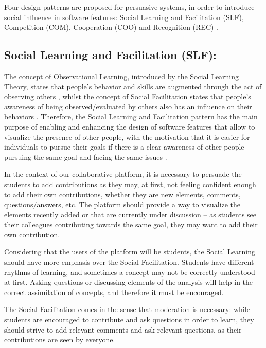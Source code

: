 Four design patterns are proposed for persuasive systems, in order to introduce social influence in software features: Social Learning and Facilitation (SLF), Competition (COM), Cooperation (COO) and Recognition (REC) \cite{oduor2014persuasive}. 

\subsection{Social Learning and Facilitation (SLF):}

The concept of Observational Learning, introduced by the Social Learning Theory, states that people's behavior and skills are augmented through the act of observing others \cite{bandura1977social}, whilst the concept of Social Facilitation states that people's awareness of being observed/evaluated by others also has an influence on their behaviors \cite{zajonc1965social}. Therefore, the Social Learning and Facilitation pattern has the main purpose of enabling and enhancing the design of software features that allow to visualize the presence of other people, with the motivation that it is easier for individuals to pursue their goals if there is a clear awareness of other people pursuing the same goal and facing the same issues \cite{oduor2014persuasive}. 

In the context of our collaborative platform, it is necessary to persuade the students to add contributions as they may, at first, not feeling confident enough to add their own contributions, whether they are new elements, comments, questions/answers, etc. The platform should provide a way to visualize the elements recently added or that are currently under discussion – as students see their colleagues contributing towards the same goal, they may want to add their own contribution.

Considering that the users of the platform will be students, the Social Learning should have more emphasis over the Social Facilitation. Students have different rhythms of learning, and sometimes a concept may not be correctly understood at first. Asking questions or discussing elements of the analysis will help in the correct assimilation of concepts, and therefore it must be encouraged.

The Social Facilitation comes in the sense that moderation is necessary: while students are encouraged to contribute and ask questions in order to learn, they should strive to add relevant comments and ask relevant questions, as their contributions are seen by everyone.

